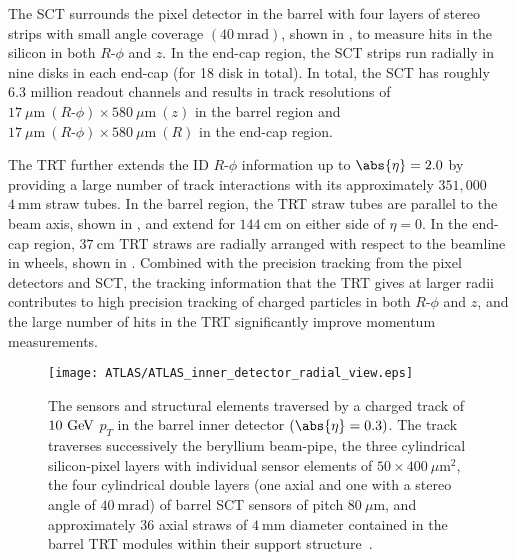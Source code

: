 The \Gls{SCT} surrounds the pixel detector in the barrel with four layers of stereo strips with small angle coverage $(40~\mathrm{mrad})$, shown in , to measure hits in the silicon in both $R\textrm{-}\phi$ and $z$.
In the end-cap region, the SCT strips run radially in nine disks in each end-cap (for 18 disk in total).
In total, the SCT has roughly 6.3 million readout channels and results in track resolutions of $17~\mu\mathrm{m}~(R\textrm{-}\phi) \times 580~\mu\mathrm{m}~(z)$ in the barrel region and $17~\mu\mathrm{m}~(R\textrm{-}\phi) \times 580~\mu\mathrm{m}~(R)$ in the end-cap region.

The \Gls{TRT} further extends the ID $R\textrm{-}\phi$ information up to $\abs{\eta} = 2.0$ by providing a large number of track interactions with its approximately $351,000$ $4~\textrm{mm}$ straw tubes.
In the barrel region, the TRT straw tubes are parallel to the beam axis, shown in , and extend for $144~\mathrm{cm}$ on either side of $\eta = 0$.
In the end-cap region, $37~\mathrm{cm}$ TRT straws are radially arranged with respect to the beamline in wheels, shown in .
Combined with the precision tracking from the pixel detectors and SCT, the tracking information that the TRT gives at larger radii contributes to high precision tracking of charged particles in both $R\textrm{-}\phi$ and $z$, and the large number of hits in the TRT significantly improve momentum measurements.

\begin{figure}[htbp]
 \centering
 \texttt{[image: ATLAS/ATLAS\_inner\_detector\_radial\_view.eps]}
 \caption[Scale cut-away view of the pixel detector, Semiconductor Tracker, and Transition Radiation Tracker in the barrel-region.]{%
  The sensors and structural elements traversed by a charged track of $10~\mathrm{GeV}$ $p_{T}$ in the barrel inner detector $(\abs{\eta} = 0.3)$.
  The track traverses successively the beryllium beam-pipe, the three cylindrical silicon-pixel layers with individual sensor elements of $50 \times 400~\mu\mathrm{m}^{2}$, the four cylindrical double layers (one axial and one with a stereo angle of $40~\mathrm{mrad}$) of barrel SCT sensors of pitch $80~\mu\mathrm{m}$, and approximately 36 axial straws of $4~\mathrm{mm}$ diameter contained in the barrel TRT modules within their support structure~\cite{PERF-2007-01}.}\label{fig:ATLAS_inner_detector_radial_view}
\end{figure}

